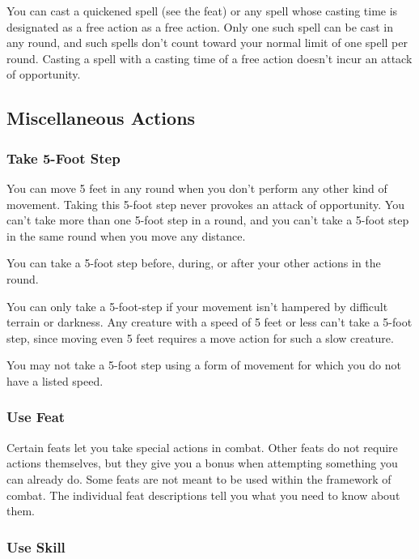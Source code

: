 You can cast a quickened spell (see the  feat) or any spell whose casting time is designated as a free action as a free action. Only one such spell can be cast in any round, and such spells don't count toward your normal limit of one spell per round. Casting a spell with a casting time of a free action doesn't incur an attack of opportunity.

\subsection{Miscellaneous Actions}

\subsubsection{Take 5-Foot Step}

You can move 5 feet in any round when you don't perform any other kind of movement. Taking this 5-foot step never provokes an attack of opportunity. You can't take more than one 5-foot step in a round, and you can't take a 5-foot step in the same round when you move any distance.

You can take a 5-foot step before, during, or after your other actions in the round. 

You can only take a 5-foot-step if your movement isn't hampered by difficult terrain or darkness. Any creature with a speed of 5 feet or less can't take a 5-foot step, since moving even 5 feet requires a move action for such a slow creature.

You may not take a 5-foot step using a form of movement for which you do not have a listed speed. 

\subsubsection{Use Feat}

Certain feats let you take special actions in combat. Other feats do not require actions themselves, but they give you a bonus when attempting something you can already do. Some feats are not meant to be used within the framework of combat. The individual feat descriptions tell you what you need to know about them.

\subsubsection{Use Skill}

